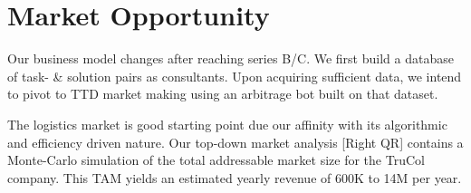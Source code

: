 \vspace{-0.16cm}
\section{Market Opportunity}
\vspace{-0.15cm}
Our business model changes after reaching series B/C. We first build a database of task- \& solution pairs as consultants. Upon acquiring sufficient data, we intend to pivot to TTD market making using an arbitrage bot built on that dataset.

\noindent The logistics market is good starting point due our affinity with its algorithmic and efficiency driven nature. Our top-down market analysis [Right QR] contains a Monte-Carlo simulation of the total addressable market size for the TruCol company. This TAM yields an estimated yearly revenue of 600K to 14M per year.
